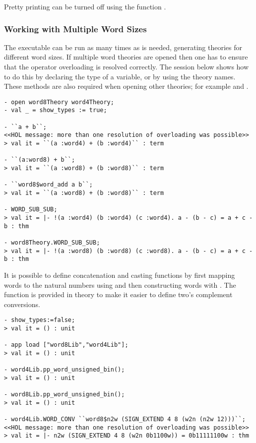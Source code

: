 {\noindent Pretty printing can be turned off using the function .

\subsubsection{Working with Multiple Word Sizes} \label{multiple}

The executable  can be run as many times as is needed,
generating theories for different word sizes.  If multiple word
theories are opened then one has to ensure that the operator
overloading is resolved correctly.  The session below shows how to do
this by declaring the type of a variable, or by using the theory
names.  These methods are also required when opening other theories;
for example  and .

\setcounter{sessioncount}{0}
\begin{session}
\begin{verbatim}
- open word8Theory word4Theory;
- val _ = show_types := true;

- ``a + b``;
<<HOL message: more than one resolution of overloading was possible>>
> val it = ``(a :word4) + (b :word4)`` : term

- ``(a:word8) + b``;
> val it = ``(a :word8) + (b :word8)`` : term

- ``word8$word_add a b``;
> val it = ``(a :word8) + (b :word8)`` : term

- WORD_SUB_SUB;
> val it = |- !(a :word4) (b :word4) (c :word4). a - (b - c) = a + c - b : thm

- word8Theory.WORD_SUB_SUB;
> val it = |- !(a :word8) (b :word8) (c :word8). a - (b - c) = a + c - b : thm
\end{verbatim}
\end{session}

It is possible to define concatenation and casting functions by first
mapping words to the natural numbers using  and then
constructing words with .  The function  is
provided in  theory to make it easier to define two's
complement conversions.
\begin{session}
\begin{verbatim}
- show_types:=false;
> val it = () : unit

- app load ["word8Lib","word4Lib"];
> val it = () : unit

- word4Lib.pp_word_unsigned_bin();
> val it = () : unit

- word8Lib.pp_word_unsigned_bin();
> val it = () : unit

- word4Lib.WORD_CONV ``word8$n2w (SIGN_EXTEND 4 8 (w2n (n2w 12)))``;
<<HOL message: more than one resolution of overloading was possible>>
> val it = |- n2w (SIGN_EXTEND 4 8 (w2n 0b1100w)) = 0b11111100w : thm
\end{verbatim}
\end{session}

} %

